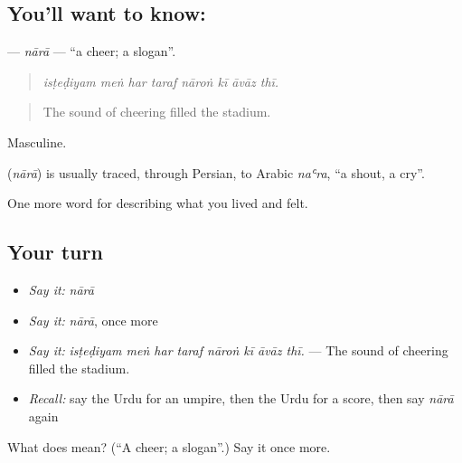 \subsection*{You'll want to know: }
\textbf{} — \emph{nārā} — \textquotedblleft{}a cheer; a slogan\textquotedblright{}.

\begin{quote}
       
\end{quote}

\begin{quote}
\emph{isṭeḍiyam meṅ har taraf nāroṅ kī āvāz thī.}
\end{quote}

\begin{quote}
The sound of cheering filled the stadium.
\end{quote}

Masculine.

\begin{cousinweb}
\textbf{} (\emph{nārā}) is usually traced, through Persian, to Arabic \emph{naʿra}, \textquotedblleft{}a shout, a cry\textquotedblright{}.
\end{cousinweb}

\begin{grammarlens}[title={What you've built}]
One more word for describing what you lived and felt.
\end{grammarlens}

\subsection*{Your turn}
\begin{itemize}
\raggedright
  \item \emph{Say it:} \emph{nārā}
  \item \emph{Say it:} \emph{nārā}, once more
  \item \emph{Say it:} \emph{isṭeḍiyam meṅ har taraf nāroṅ kī āvāz thī.} — The sound of cheering filled the stadium.
  \item \emph{Recall:} say the Urdu for an umpire, then the Urdu for a score, then say \emph{nārā} again
\end{itemize}

\begin{tcolorbox}[breakable,colback=teal!4,colframe=teal!35!black,title={Before you move on}]
What does  mean? (\textquotedblleft{}A cheer; a slogan\textquotedblright{}.) Say it once more.
\end{tcolorbox}
